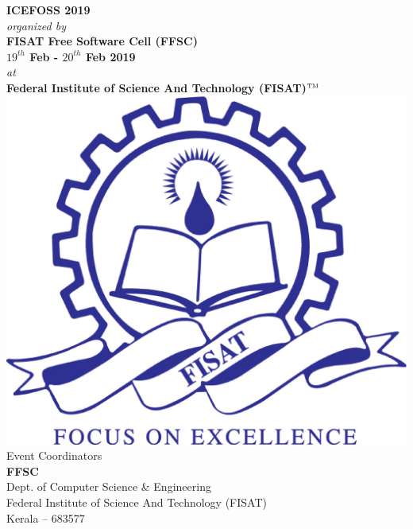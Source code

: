 \newpage
\begin{center}
{\large \textbf{ICEFOSS 2019}} \\[.3cm]
\textit{organized by}\\[.4cm]
{\large \textbf{FISAT Free Software Cell (FFSC)}}\\ [.3cm]
\textbf{{\large $19^{th}$ Feb - $20^{th}$ Feb 2019}}\\[.5cm]
\textit{{\small at}}\\[.3cm]
{\large\textbf{ Federal Institute of Science And Technology (FISAT)$^{\tiny{\mbox{TM}}}$}} \\[.4cm]
\includegraphics[scale=.13]{logod}\\
\vfill
Event Coordinators\\ 
\textbf{FFSC}\\
Dept. of Computer Science \& Engineering\\
Federal Institute of Science And Technology (FISAT)\\
Kerala – 683577
\end{center}


\thispagestyle{empty} 